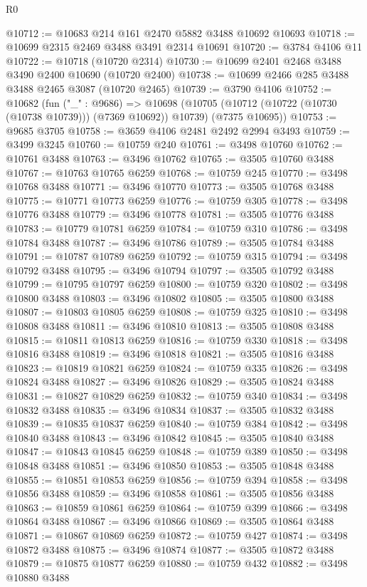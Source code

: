 \begin{lexlean}{R0}
\begin{coremodule}
@10712 := @10683 @214 @161 @2470 @5882 @3488 @10692 @10693
@10718 := @10699 @2315 @2469 @3488 @3491 @2314 @10691
@10720 := @3784 @4106 @11
@10722 := @10718 (@10720 @2314)
@10730 := @10699 @2401 @2468 @3488 @3490 @2400 @10690 (@10720 @2400)
@10738 := @10699 @2466 @285 @3488 @3488 @2465 @3087 (@10720 @2465)
@10739 := @3790 @4106
@10752 := @10682
    (fun ("_" : @9686) =>
    @10698 (@10705 (@10712 (@10722 (@10730 (@10738 @10739))) (@7369 @10692)) @10739) (@7375 @10695))
@10753 := @9685 @3705
@10758 := @3659 @4106 @2481 @2492 @2994 @3493
@10759 := @3499 @3245
@10760 := @10759 @240
@10761 := @3498 @10760
@10762 := @10761 @3488
@10763 := @3496 @10762
@10765 := @3505 @10760 @3488
@10767 := @10763 @10765 @6259
@10768 := @10759 @245
@10770 := @3498 @10768 @3488
@10771 := @3496 @10770
@10773 := @3505 @10768 @3488
@10775 := @10771 @10773 @6259
@10776 := @10759 @305
@10778 := @3498 @10776 @3488
@10779 := @3496 @10778
@10781 := @3505 @10776 @3488
@10783 := @10779 @10781 @6259
@10784 := @10759 @310
@10786 := @3498 @10784 @3488
@10787 := @3496 @10786
@10789 := @3505 @10784 @3488
@10791 := @10787 @10789 @6259
@10792 := @10759 @315
@10794 := @3498 @10792 @3488
@10795 := @3496 @10794
@10797 := @3505 @10792 @3488
@10799 := @10795 @10797 @6259
@10800 := @10759 @320
@10802 := @3498 @10800 @3488
@10803 := @3496 @10802
@10805 := @3505 @10800 @3488
@10807 := @10803 @10805 @6259
@10808 := @10759 @325
@10810 := @3498 @10808 @3488
@10811 := @3496 @10810
@10813 := @3505 @10808 @3488
@10815 := @10811 @10813 @6259
@10816 := @10759 @330
@10818 := @3498 @10816 @3488
@10819 := @3496 @10818
@10821 := @3505 @10816 @3488
@10823 := @10819 @10821 @6259
@10824 := @10759 @335
@10826 := @3498 @10824 @3488
@10827 := @3496 @10826
@10829 := @3505 @10824 @3488
@10831 := @10827 @10829 @6259
@10832 := @10759 @340
@10834 := @3498 @10832 @3488
@10835 := @3496 @10834
@10837 := @3505 @10832 @3488
@10839 := @10835 @10837 @6259
@10840 := @10759 @384
@10842 := @3498 @10840 @3488
@10843 := @3496 @10842
@10845 := @3505 @10840 @3488
@10847 := @10843 @10845 @6259
@10848 := @10759 @389
@10850 := @3498 @10848 @3488
@10851 := @3496 @10850
@10853 := @3505 @10848 @3488
@10855 := @10851 @10853 @6259
@10856 := @10759 @394
@10858 := @3498 @10856 @3488
@10859 := @3496 @10858
@10861 := @3505 @10856 @3488
@10863 := @10859 @10861 @6259
@10864 := @10759 @399
@10866 := @3498 @10864 @3488
@10867 := @3496 @10866
@10869 := @3505 @10864 @3488
@10871 := @10867 @10869 @6259
@10872 := @10759 @427
@10874 := @3498 @10872 @3488
@10875 := @3496 @10874
@10877 := @3505 @10872 @3488
@10879 := @10875 @10877 @6259
@10880 := @10759 @432
@10882 := @3498 @10880 @3488

\end{coremodule}
\end{lexlean}
